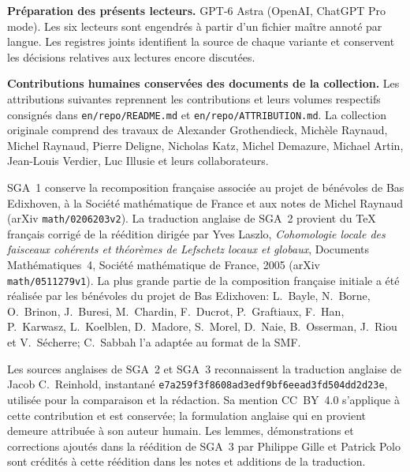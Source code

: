 \noindent\textbf{Pr\'eparation des pr\'esents lecteurs.} GPT-6 Astra (OpenAI, ChatGPT Pro mode). Les six lecteurs sont engendr\'es \`a partir d'un fichier ma\^itre annot\'e par langue. Les registres joints identifient la source de chaque variante et conservent les d\'ecisions relatives aux lectures encore discut\'ees.

\noindent\textbf{Contributions humaines conserv\'ees des documents de la collection.} Les attributions suivantes reprennent les contributions et leurs volumes respectifs consign\'es dans \texttt{en/repo/README.md} et \texttt{en/repo/ATTRIBUTION.md}. La collection originale comprend des travaux de Alexander Grothendieck, Mich\`ele Raynaud, Michel Raynaud, Pierre Deligne, Nicholas Katz, Michel Demazure, Michael Artin, Jean-Louis Verdier, Luc Illusie et leurs collaborateurs.

SGA~1 conserve la recomposition fran\c{c}aise associ\'ee au projet de b\'en\'evoles de Bas Edixhoven, \`a la Soci\'et\'e math\'ematique de France et aux notes de Michel Raynaud (arXiv \texttt{math/0206203v2}). La traduction anglaise de SGA~2 provient du TeX fran\c{c}ais corrig\'e de la r\'e\'edition dirig\'ee par Yves Laszlo, \textit{Cohomologie locale des faisceaux coh\'erents et th\'eor\`emes de Lefschetz locaux et globaux}, Documents Math\'ematiques~4, Soci\'et\'e math\'ematique de France, 2005 (arXiv \texttt{math/0511279v1}). La plus grande partie de la composition fran\c{c}aise initiale a \'et\'e r\'ealis\'ee par les b\'en\'evoles du projet de Bas Edixhoven: L.~Bayle, N.~Borne, O.~Brinon, J.~Buresi, M.~Chardin, F.~Ducrot, P.~Graftiaux, F.~Han, P.~Karwasz, L.~Koelblen, D.~Madore, S.~Morel, D.~Naie, B.~Osserman, J.~Riou et V.~S\'echerre; C.~Sabbah l'a adapt\'ee au format de la SMF.

Les sources anglaises de SGA~2 et SGA~3 reconnaissent la traduction anglaise de Jacob C.~Reinhold, instantan\'e \texttt{e7a259f3f8608ad3edf9bf6eead3fd504dd2d23e}, utilis\'ee pour la comparaison et la r\'edaction. Sa mention CC~BY~4.0 s'applique \`a cette contribution et est conserv\'ee; la formulation anglaise qui en provient demeure attribu\'ee \`a son auteur humain. Les lemmes, d\'emonstrations et corrections ajout\'es dans la r\'e\'edition de SGA~3 par Philippe Gille et Patrick Polo sont cr\'edit\'es \`a cette r\'e\'edition dans les notes et additions de la traduction.

